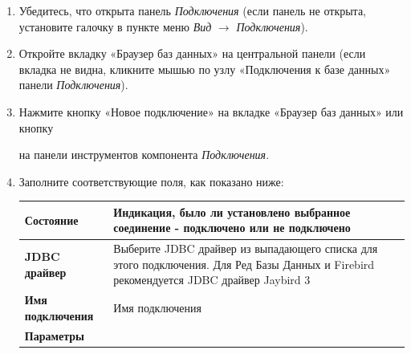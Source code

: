\begin{enumerate}[leftmargin=15pt]
	\item Убедитесь, что открыта панель \textit{Подключения} (если панель не открыта, установите галочку в пункте меню \textit{Вид} $\rightarrow$ \textit{Подключения}).
	\item Откройте вкладку «Браузер баз данных» на центральной панели (если вкладка не видна, кликните мышью по узлу «Подключения к базе данных» панели \textit{Подключения}).
	\item Нажмите кнопку «Новое подключение» на вкладке «Браузер баз данных» или кнопку 
	на панели инструментов компонента \textit{Подключения}.
	\item Заполните соответствующие поля, как показано ниже:
	\begin{longtable}[r]{|>{\bfseries}m{3.9cm}|m{11cm}|}
		\hline
		Состояние & Индикация, было ли установлено выбранное соединение - подключено или не подключено\\\hline
		JDBC драйвер & Выберите JDBC драйвер из выпадающего списка для этого подключения. Для Ред Базы Данных и Firebird рекомендуется JDBC драйвер Jaybird 3\\\hline
		Имя подключения & Имя подключения \\\hline
		Параметры
		

\end{longtable}
\end{enumerate}
